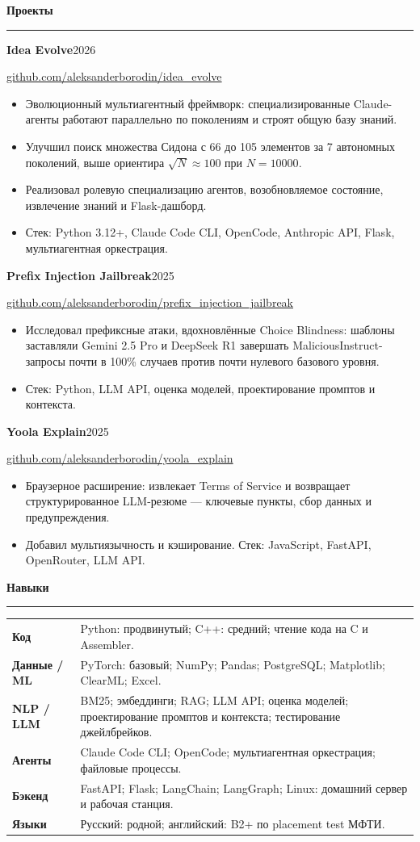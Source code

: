 \documentclass[10pt,a4paper]{article}
\newcommand{\sectiontitle}[1]{%
  \vspace{0.38em}%
  {\normalsize\bfseries\color{accent} #1}\par
  \vspace{0.08em}\hrule\vspace{0.21em}%
}
\newcommand{\entry}[4]{%
  \textbf{#1}\hfill {\color{textgray}#2}\par
  {\color{textgray}#3}\par
  #4\vspace{0.21em}%
}
\begin{document}
\sectiontitle{Проекты}
\entry{Idea Evolve}{2026}{\href{https://github.com/aleksanderborodin/idea_evolve}{github.com/aleksanderborodin/idea\_evolve}}{%
\begin{itemize}
  \item Эволюционный мультиагентный фреймворк: специализированные Claude-агенты работают параллельно по поколениям и строят общую базу знаний.
  \item Улучшил поиск множества Сидона с 66 до 105 элементов за 7 автономных поколений, выше ориентира $\sqrt{N}\approx100$ при $N=10000$.
  \item Реализовал ролевую специализацию агентов, возобновляемое состояние, извлечение знаний и Flask-дашборд.
  \item Стек: Python 3.12+, Claude Code CLI, OpenCode, Anthropic API, Flask, мультиагентная оркестрация.
\end{itemize}
}

\entry{Prefix Injection Jailbreak}{2025}{\href{https://github.com/aleksanderborodin/prefix_injection_jailbreak}{github.com/aleksanderborodin/prefix\_injection\_jailbreak}}{%
\begin{itemize}
  \item Исследовал префиксные атаки, вдохновлённые Choice Blindness: шаблоны заставляли Gemini 2.5 Pro и DeepSeek R1 завершать MaliciousInstruct-запросы почти в 100\% случаев против почти нулевого базового уровня.
  \item Стек: Python, LLM API, оценка моделей, проектирование промптов и контекста.
\end{itemize}
}

\entry{Yoola Explain}{2025}{\href{https://github.com/aleksanderborodin/yoola_explain}{github.com/aleksanderborodin/yoola\_explain}}{%
\begin{itemize}
  \item Браузерное расширение: извлекает Terms of Service и возвращает структурированное LLM-резюме — ключевые пункты, сбор данных и предупреждения.
  \item Добавил мультиязычность и кэширование. Стек: JavaScript, FastAPI, OpenRouter, LLM API.
\end{itemize}
}

\sectiontitle{Навыки}
\begin{tabularx}{\textwidth}{@{}>{\bfseries}p{2.50cm}X@{}}
Код & Python: продвинутый; C++: средний; чтение кода на C и Assembler. \\
Данные / ML & PyTorch: базовый; NumPy; Pandas; PostgreSQL; Matplotlib; ClearML; Excel. \\
NLP / LLM & BM25; эмбеддинги; RAG; LLM API; оценка моделей; проектирование промптов и контекста; тестирование джейлбрейков. \\
Агенты & Claude Code CLI; OpenCode; мультиагентная оркестрация; файловые процессы. \\
Бэкенд & FastAPI; Flask; LangChain; LangGraph; Linux: домашний сервер и рабочая станция. \\
Языки & Русский: родной; английский: B2+ по placement test МФТИ. \\
\end{tabularx}
\end{document}
